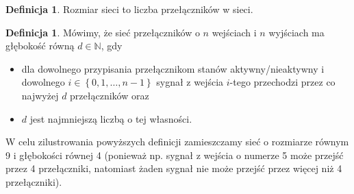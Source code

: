 \documentclass[a4paper]{article}
\newcommand{\N}{\mathbb{N}}
\newcommand{\lt}{\left}
\newcommand{\rt}{\right}
\theoremstyle{definition}
\newtheorem{df}[tw]{Definicja}
\begin{document}
\begin{df}
    Rozmiar sieci to liczba przełączników w sieci.
\end{df}

\begin{df}
    Mówimy, że sieć przełączników o \(n\) wejściach i \(n\) wyjściach ma głębokość równą \(d \in \N\), gdy 
    \begin{itemize}
        \item  dla dowolnego przypisania przełącznikom stanów aktywny/nieaktywny i dowolnego \(i \in \lt\{ 0, 1, \ldots, n-1 \rt\} \) sygnał z wejścia \(i\)-tego przechodzi przez co najwyżej \(d\) przełączników oraz 
        \item \(d\) jest najmniejszą liczbą o tej własności.
    \end{itemize}
\end{df}

W celu zilustrowania powyższych definicji zamieszczamy sieć o rozmiarze równym 9 i głębokości równej 4 (ponieważ np. sygnał z wejścia o numerze 5 może przejść przez 4 przełączniki, natomiast żaden sygnał nie może przejść przez więcej niż 4 przełączniki). 
\end{document}
